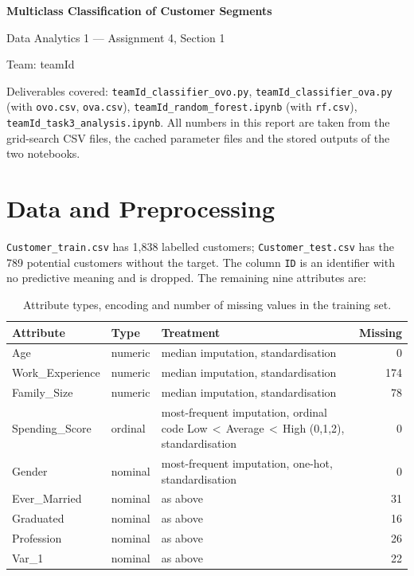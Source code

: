 \documentclass[11pt]{article}
\begin{document}
\begin{titlepage}
\centering\vspace*{4cm}
{\LARGE\bfseries Multiclass Classification of Customer Segments\par}\vspace{0.6cm}
{\large Data Analytics 1 --- Assignment 4, Section 1\par}\vspace{0.4cm}
{\large Team: teamId\par}\vspace{1.5cm}
\begin{minipage}{0.8\textwidth}\small\raggedright
Deliverables covered: \texttt{teamId\_classifier\_ovo.py}, \texttt{teamId\_classifier\_ova.py}
(with \texttt{ovo.csv}, \texttt{ova.csv}), \texttt{teamId\_random\_forest.ipynb} (with \texttt{rf.csv}),
\texttt{teamId\_task3\_analysis.ipynb}.
All numbers in this report are taken from the grid-search CSV files, the cached parameter files and
the stored outputs of the two notebooks.
\end{minipage}
\end{titlepage}
\tableofcontents
\newpage

\section{Data and Preprocessing}
\texttt{Customer\_train.csv} has 1{,}838 labelled customers; \texttt{Customer\_test.csv} has the
789 potential customers without the target. The column \texttt{ID} is an identifier with no
predictive meaning and is dropped. The remaining nine attributes are:

\begin{table}[H]\centering\small
\caption{Attribute types, encoding and number of missing values in the training set.}\label{tab:attrs}
\begin{tabular}{@{}llp{6.2cm}r@{}}
\toprule
Attribute & Type & Treatment & Missing \\
\midrule
Age & numeric & median imputation, standardisation & 0 \\
Work\_Experience & numeric & median imputation, standardisation & 174 \\
Family\_Size & numeric & median imputation, standardisation & 78 \\
Spending\_Score & ordinal & most-frequent imputation, ordinal code Low\,$<$\,Average\,$<$\,High (0,1,2), standardisation & 0 \\
Gender & nominal & most-frequent imputation, one-hot, standardisation & 0 \\
Ever\_Married & nominal & as above & 31 \\
Graduated & nominal & as above & 16 \\
Profession & nominal & as above & 26 \\
Var\_1 & nominal & as above & 22 \\
\bottomrule
\end{tabular}
\end{table}
\end{document}
